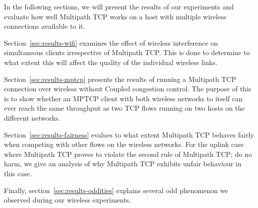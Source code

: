In the following sections, we will present the results of our experiments and
evaluate how well Multipath TCP works on a host with multiple wireless
connections available to it.

Section~\ref{sec:results-wifi} examines the effect of wireless interference on
simultaneous clients irrespective of Multipath TCP. This is done to determine to
what extent this will affect the quality of the individual wireless links.

Section~\ref{sec:results-mptcp} presents the results of running a Multipath TCP
connection over wireless without Coupled congestion control. The purpose of this
is to show whether an MPTCP client with both wireless networks to itself can
ever reach the same throughput as two TCP flows running on two hosts on
the different networks.

Section~\ref{sec:results-fairness} evalues to what extent Multipath TCP behaves
fairly when competing with other flows on the wireless networks. For the uplink
case where Multipath TCP proves to violate the second rule of Multipath TCP; do
no harm, we give an analysis of why Multipath TCP exhibits unfair behaviour in
this case.

Finally, section~\ref{sec:results-oddities} explains several odd phenomenon we
observed during our wireless experiments.
